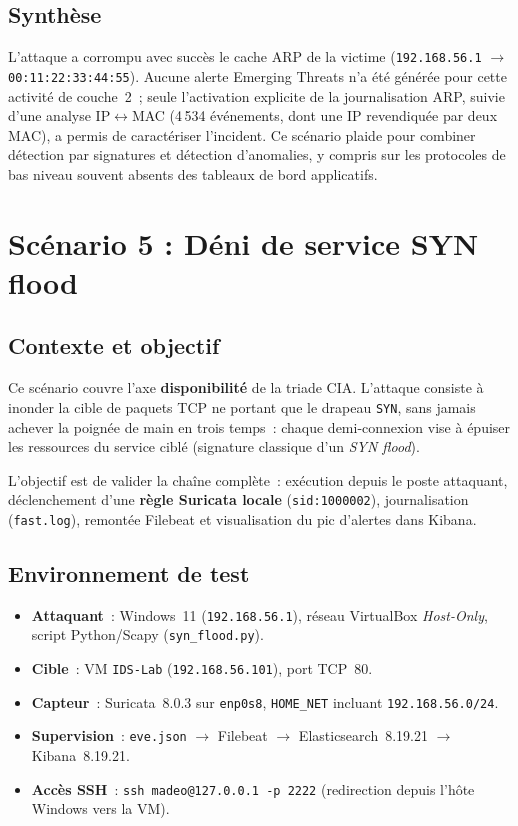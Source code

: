 \documentclass[12pt]{article}
\begin{document}
\subsection{Synthèse}

L'attaque a corrompu avec succès le cache ARP de la victime
(\texttt{192.168.56.1} $\rightarrow$ \texttt{00:11:22:33:44:55}). Aucune
alerte Emerging Threats n'a été générée pour cette activité de couche~2~;
seule l'activation explicite de la journalisation ARP, suivie d'une analyse
IP$\leftrightarrow$MAC (4\,534 événements, dont une IP revendiquée par deux
MAC), a permis de caractériser l'incident. Ce scénario plaide pour combiner
détection par signatures et détection d'anomalies, y compris sur les protocoles
de bas niveau souvent absents des tableaux de bord applicatifs.

\section{Scénario 5 : Déni de service SYN flood}\label{sec:Q6}

\subsection{Contexte et objectif}

Ce scénario couvre l'axe \textbf{disponibilité} de la triade CIA. L'attaque consiste
à inonder la cible de paquets TCP ne portant que le drapeau \texttt{SYN}, sans
jamais achever la poignée de main en trois temps~: chaque demi-connexion vise à
épuiser les ressources du service ciblé (signature classique d'un \textit{SYN flood}).

L'objectif est de valider la chaîne complète~: exécution depuis le poste attaquant,
déclenchement d'une \textbf{règle Suricata locale} (\texttt{sid:1000002}),
journalisation (\texttt{fast.log}), remontée Filebeat et visualisation du pic
d'alertes dans Kibana.

\subsection{Environnement de test}

\begin{itemize}[nosep]
  \item \textbf{Attaquant}~: Windows~11 (\texttt{192.168.56.1}), réseau VirtualBox
        \textit{Host-Only}, script Python/Scapy (\texttt{syn\_flood.py}).
  \item \textbf{Cible}~: VM \texttt{IDS-Lab} (\texttt{192.168.56.101}), port TCP~80.
  \item \textbf{Capteur}~: Suricata~8.0.3 sur \texttt{enp0s8},
        \texttt{HOME\_NET} incluant \texttt{192.168.56.0/24}.
  \item \textbf{Supervision}~: \texttt{eve.json} $\rightarrow$ Filebeat
        $\rightarrow$ Elasticsearch~8.19.21 $\rightarrow$ Kibana~8.19.21.
  \item \textbf{Accès SSH}~: \texttt{ssh madeo@127.0.0.1 -p 2222} (redirection
        depuis l'hôte Windows vers la VM).
\end{itemize}
\end{document}
